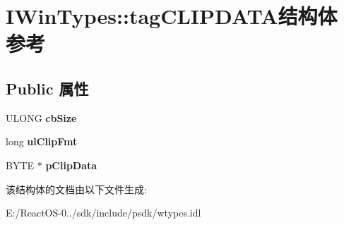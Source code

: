 \hypertarget{struct_i_win_types_1_1tag_c_l_i_p_d_a_t_a}{}\section{I\+Win\+Types\+:\+:tag\+C\+L\+I\+P\+D\+A\+T\+A结构体 参考}
\label{struct_i_win_types_1_1tag_c_l_i_p_d_a_t_a}
\subsection*{Public 属性}
\begin{DoxyCompactItemize}
\item 
\mbox{\label{struct_i_win_types_1_1tag_c_l_i_p_d_a_t_a_a5fb3a4ecbcd7fedc21c29eee9458f0e3}} 
U\+L\+O\+NG {\bfseries cb\+Size}
\item 
\mbox{\label{struct_i_win_types_1_1tag_c_l_i_p_d_a_t_a_a33ae18b2ff4f92212b9bf9a7abb7a418}} 
long {\bfseries ul\+Clip\+Fmt}
\item 
\mbox{\label{struct_i_win_types_1_1tag_c_l_i_p_d_a_t_a_a0b91f05b44220c8e10a5f729ffe3348a}} 
B\+Y\+TE $\ast$ {\bfseries p\+Clip\+Data}
\end{DoxyCompactItemize}


该结构体的文档由以下文件生成\+:\begin{DoxyCompactItemize}
\item 
E\+:/\+React\+O\+S-\/0../sdk/include/psdk/wtypes.\+idl\end{DoxyCompactItemize}

